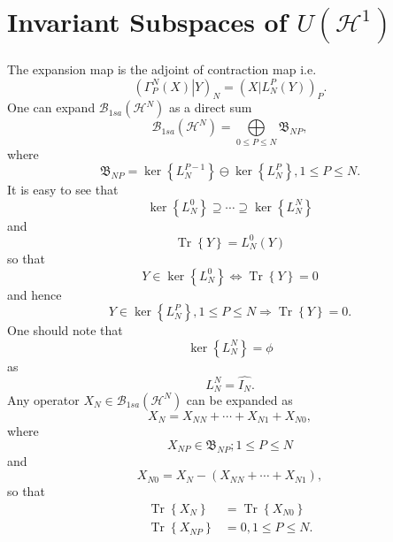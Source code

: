 \documentclass[aps,preprint]{revtex4}%
\begin{document}
\section{Invariant Subspaces of $U\left(  \mathcal{H}^{1}\right)  $}

The expansion map is the adjoint of contraction map i.e.
\begin{equation}
\left(  \left.  \Gamma_{P}^{N}\left(  X\right)  \right\vert Y\right)
_{N}=\left(  \left.  X\right\vert L_{N}^{P}\left(  Y\right)  \right)  _{P}.
\end{equation}
One can expand $\mathcal{B}_{1sa}\left(  \mathcal{H}^{N}\right)  $ as a direct
sum
\begin{equation}
\mathcal{B}_{1sa}\left(  \mathcal{H}^{N}\right)  =%
{\displaystyle\bigoplus\limits_{0\leq P\leq N}}
\mathfrak{B}_{NP},
\end{equation}
where
\begin{equation}
\mathfrak{B}_{NP}=\ker\left\{  L_{N}^{P-1}\right\}  \ominus\ker\left\{
L_{N}^{P}\right\}  ,1\leq P\leq N.
\end{equation}
It is easy to see that%
\begin{equation}
\ker\left\{  L_{N}^{0}\right\}  \supseteq\cdots\supseteq\ker\left\{  L_{N}%
^{N}\right\}
\end{equation}
and%
\begin{equation}
\operatorname*{Tr}\left\{  Y\right\}  =L_{N}^{0}\left(  Y\right)
\end{equation}
so that
\begin{equation}
Y\in\ker\left\{  L_{N}^{0}\right\}  \Leftrightarrow\operatorname*{Tr}\left\{
Y\right\}  =0
\end{equation}
and hence
\begin{equation}
Y\in\ker\left\{  L_{N}^{P}\right\}  ,1\leq P\leq N\Rightarrow
\operatorname*{Tr}\left\{  Y\right\}  =0.
\end{equation}
One should note that
\begin{equation}
\ker\left\{  L_{N}^{N}\right\}  =\phi
\end{equation}
as
\begin{equation}
L_{N}^{N}=\widehat{I_{N}}.
\end{equation}
Any operator $X_{N}\in\mathcal{B}_{1sa}\left(  \mathcal{H}^{N}\right)  $ can
be expanded as
\begin{equation}
X_{N}=X_{NN}+\cdots+X_{N1}+X_{N0},
\end{equation}
where
\begin{equation}
X_{NP}\in\mathfrak{B}_{NP};1\leq P\leq N
\end{equation}
and
\begin{equation}
X_{N0}=X_{N}-\left(  X_{NN}+\cdots+X_{N1}\right)  ,
\end{equation}
so that
\begin{align}
\operatorname*{Tr}\left\{  X_{N}\right\}   &  =\operatorname*{Tr}\left\{
X_{N0}\right\} \nonumber\\
\operatorname*{Tr}\left\{  X_{NP}\right\}   &  =0,1\leq P\leq N.
\end{align}
\end{document}
